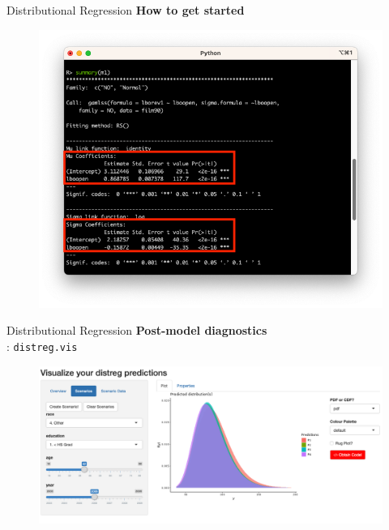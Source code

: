 \documentclass[t]{beamer} 	%
\begin{document}
\begin{frame}{Distributional Regression}
	\textbf{How to get started}
	\vspace{-0.3cm}
	\begin{figure}
		\includegraphics[width=\textwidth]{images/code_gamlss2.png}
	\end{figure}
\end{frame}

\begin{frame}{Distributional Regression}
	\textbf{Post-model diagnostics} \\
	\citet{stadlmann2022}: \texttt{distreg.vis}
	\begin{figure}
		\centering
		\includegraphics[width=\textwidth]{images/distreg.vis.png}
	\end{figure}
\end{frame}
\end{document}
